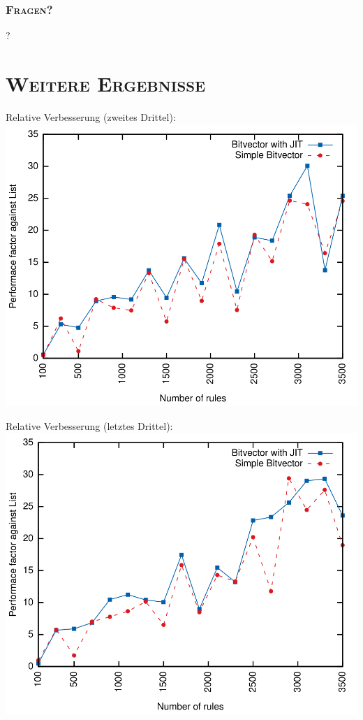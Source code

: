 \documentclass[xcolor=x11names,compress]{beamer}
\renewcommand{\(}{\begin{columns}}
\renewcommand{\)}{\end{columns}}
\newcommand{\<}[1]{\begin{column}{#1}}
\renewcommand{\>}{\end{column}}
\begin{document}
\section{}
\begin{frame}
  \frametitle{\scshape Fragen?}
  \centering\Huge{?}
\end{frame}

\appendix
\section{\scshape Weitere Ergebnisse}
\begin{frame}[noframenumbering]
  Relative Verbesserung (zweites Drittel):
  \includegraphics[height=0.9\textheight]{figures/eval_a_relative}
\end{frame}

\begin{frame}[noframenumbering]
  Relative Verbesserung (letztes Drittel):
  \includegraphics[height=0.9\textheight]{figures/eval_w_relative}
\end{frame}
\end{document}
